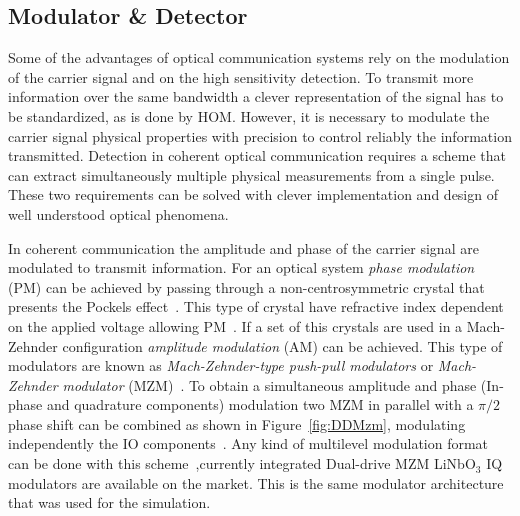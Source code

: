 \subsection{Modulator \& Detector}
Some of the advantages of optical communication systems rely on the modulation of the carrier signal and on the high sensitivity detection. To transmit more information over the same bandwidth a clever representation of the signal has to be standardized, as is done by HOM. However, it is necessary to modulate the carrier signal physical properties with precision to control reliably the information transmitted. Detection in coherent optical communication requires a scheme that can extract simultaneously multiple physical measurements from a single pulse. These two requirements can be solved with clever implementation and design of well understood optical phenomena.

In coherent communication the amplitude and phase of the carrier signal are modulated to transmit information. For an optical system \textit{phase modulation} (PM) can be achieved by passing through a non-centrosymmetric crystal that presents the Pockels effect~\cite{FiberAgrawal,kikuchi2015fundamentals}. This type of crystal have refractive index dependent on the applied voltage allowing PM~\cite{kikuchi2015fundamentals}. If a set of this crystals are used in a Mach-Zehnder configuration \textit{amplitude modulation} (AM) can be achieved.  This type of modulators are known as \textit{Mach-Zehnder-type push-pull modulators} or \textit{Mach-Zehnder modulator} (MZM)~\cite{kikuchi2015fundamentals}. To obtain a simultaneous amplitude and phase (In-phase and quadrature components)  modulation two MZM in parallel with a $\pi/2$ phase shift can be combined as shown in Figure~\ref{fig:DDMzm}, modulating independently the IO  components~\cite{kikuchi2015fundamentals}. Any kind of multilevel modulation format can be done with this scheme~\cite{ho2005generation},currently  integrated Dual-drive MZM LiNbO$_3$ IQ modulators are available on the market. This is the same modulator architecture that was used for the simulation.   


